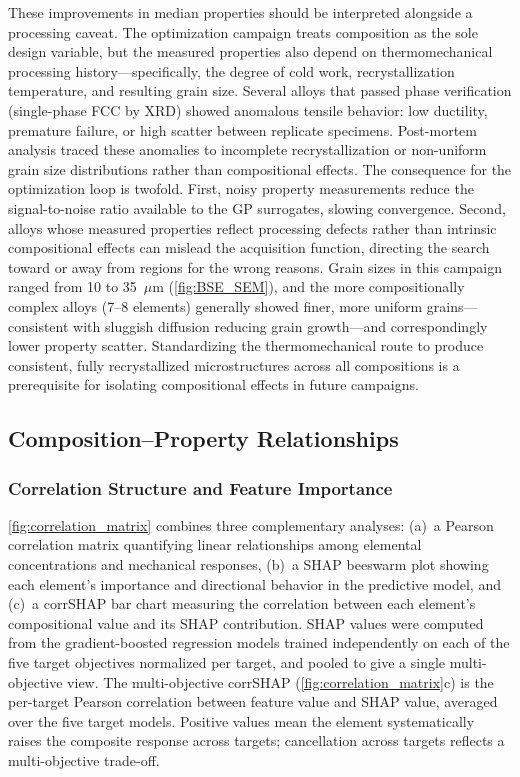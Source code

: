 \documentclass[preprint,12pt,times]{elsarticle}  %
\begin{document}
These improvements in median properties should be interpreted alongside a processing caveat. The optimization campaign treats composition as the sole design variable, but the measured properties also depend on thermomechanical processing history---specifically, the degree of cold work, recrystallization temperature, and resulting grain size. Several alloys that passed phase verification (single-phase FCC by XRD) showed anomalous tensile behavior: low ductility, premature failure, or high scatter between replicate specimens. Post-mortem analysis traced these anomalies to incomplete recrystallization or non-uniform grain size distributions rather than compositional effects. The consequence for the optimization loop is twofold. First, noisy property measurements reduce the signal-to-noise ratio available to the GP surrogates, slowing convergence. Second, alloys whose measured properties reflect processing defects rather than intrinsic compositional effects can mislead the acquisition function, directing the search toward or away from regions for the wrong reasons. Grain sizes in this campaign ranged from 10 to 35~$\mu$m (\autoref{fig:BSE_SEM}), and the more compositionally complex alloys (7--8 elements) generally showed finer, more uniform grains---consistent with sluggish diffusion reducing grain growth---and correspondingly lower property scatter. Standardizing the thermomechanical route to produce consistent, fully recrystallized microstructures across all compositions is a prerequisite for isolating compositional effects in future campaigns.

\subsection{Composition--Property Relationships}

\subsubsection{Correlation Structure and Feature Importance}

\autoref{fig:correlation_matrix} combines three complementary analyses: (a)~a Pearson correlation matrix quantifying linear relationships among elemental concentrations and mechanical responses, (b)~a SHAP beeswarm plot showing each element's importance and directional behavior in the predictive model, and (c)~a corrSHAP bar chart measuring the correlation between each element's compositional value and its SHAP contribution. SHAP values were computed from the gradient-boosted regression models trained independently on each of the five target objectives normalized per target, and pooled to give a single multi-objective view. The multi-objective corrSHAP (\autoref{fig:correlation_matrix}c) is the per-target Pearson correlation between feature value and SHAP value, averaged over the five target models. Positive values mean the element systematically raises the composite response across targets; cancellation across targets reflects a multi-objective trade-off.
\end{document}
